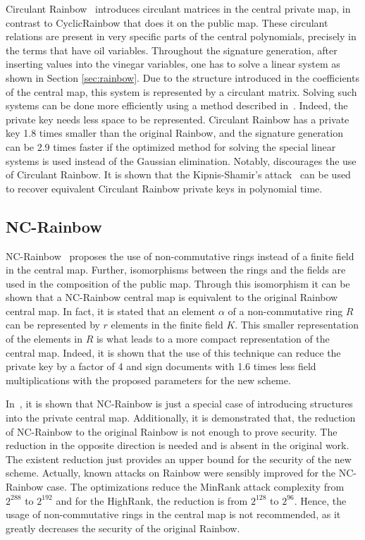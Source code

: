 \documentclass{ufsctex/ufsctex}
\begin{document}
Circulant Rainbow~\cite{peng2017circulant} introduces circulant matrices in the
central private map, in contrast to CyclicRainbow that does it on the public
map. These circulant relations are present in very specific parts of the
central polynomials, precisely in the terms that have oil variables. Throughout
the signature generation, after inserting values into the vinegar variables,
one has to solve a linear system as shown in Section \ref{sec:rainbow}. Due to
the structure introduced in the coefficients of the central map, this system is
represented by a circulant matrix. Solving such systems can be done more
efficiently using a method described in~\cite{peng2017circulant}. Indeed, the
private key needs less space to be represented. Circulant Rainbow has a private
key 1.8 times smaller than the original Rainbow, and the signature generation
can be 2.9 times faster if the optimized method for solving the special linear
systems is used instead of the Gaussian elimination. Notably,
\cite{hashimoto2018security} discourages the use of Circulant Rainbow. It is
shown that the Kipnis-Shamir's attack~\cite{kipnis1998cryptanalysis} can be
used to recover equivalent Circulant Rainbow private keys in polynomial time.

\subsection{NC-Rainbow}

NC-Rainbow~\cite{yasuda2012reducing} proposes the use of non-commutative rings
instead of a finite field in the central map. Further, isomorphisms between the
rings and the fields are used in the composition of the public map. Through
this isomorphism it can be shown that a NC-Rainbow central map is equivalent to
the original Rainbow central map. In fact, it is stated that an element
$\alpha$ of a non-commutative ring $R$ can be represented by $r$ elements in
the finite field $K$. This smaller representation of the elements in $R$ is
what leads to a more compact representation of the central map. Indeed, it is
shown that the use of this technique can reduce the private key by a factor of
4 and sign documents with 1.6 times less field multiplications with the
proposed parameters for the new scheme.

In~\cite{thomae2012quo}, it is shown that NC-Rainbow is just a special case of
introducing structures into the private central map. Additionally, it is
demonstrated that, the reduction of NC-Rainbow to the original Rainbow is not
enough to prove security. The reduction in the opposite direction is needed and
is absent in the original work. The existent reduction just provides an upper
bound for the security of the new scheme. Actually, known attacks on Rainbow
were sensibly improved for the NC-Rainbow case. The optimizations reduce the
MinRank attack complexity from $2^{288}$ to $2^{192}$ and for the HighRank, the
reduction is from $2^{128}$ to $2^{96}$. Hence, the usage of non-commutative
rings in the central map is not recommended, as it greatly decreases the
security of the original Rainbow.
\end{document}

